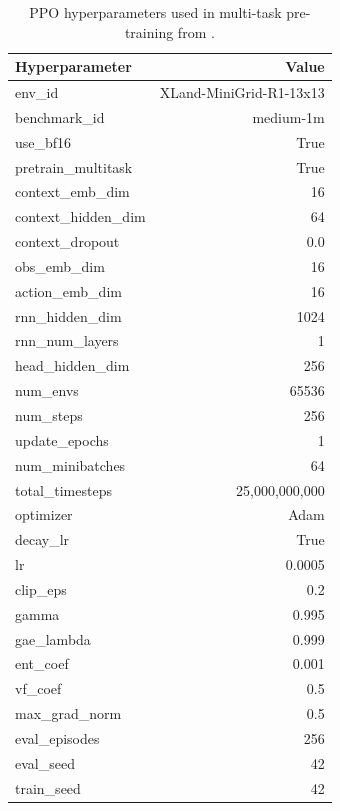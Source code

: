 \documentclass{article}
\begin{document}
\begin{table}[h!]
    \begin{small}
    \begin{center}
    \caption{PPO hyperparameters used in multi-task pre-training from .}
    \label{table:ppo-hparams}
        \begin{tabular}{lr}
		\toprule
            \textbf{Hyperparameter} & \textbf{Value} \\
		\midrule
            env\_id                 & XLand-MiniGrid-R1-13x13 \\
            benchmark\_id           & medium-1m \\
            use\_bf16               & True \\
            pretrain\_multitask     & True \\
            context\_emb\_dim       & 16 \\
            context\_hidden\_dim    & 64 \\
            context\_dropout        & 0.0 \\
            obs\_emb\_dim           & 16 \\
            action\_emb\_dim        & 16 \\
            rnn\_hidden\_dim        & 1024 \\
            rnn\_num\_layers        & 1 \\
            head\_hidden\_dim       & 256 \\
            num\_envs               & 65536 \\
            num\_steps              & 256 \\
            update\_epochs          & 1 \\
            num\_minibatches        & 64 \\
            total\_timesteps        & 25,000,000,000 \\
            optimizer               & Adam \\
            decay\_lr               & True \\
            lr                      & 0.0005 \\
            clip\_eps               & 0.2 \\
            gamma                   & 0.995 \\
            gae\_lambda             & 0.999 \\
            ent\_coef               & 0.001 \\
            vf\_coef                & 0.5 \\
            max\_grad\_norm         & 0.5 \\
            eval\_episodes          & 256 \\
            eval\_seed              & 42 \\
            train\_seed             & 42 \\
		\bottomrule
		\end{tabular}
    \end{center}
    \end{small}
\end{table}
\end{document}
